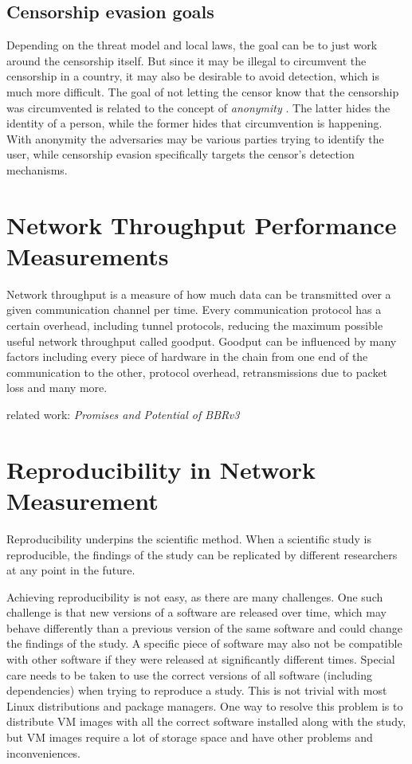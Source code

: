 \subsection{Censorship evasion goals}
Depending on the threat model and local laws, the goal can be to just work around the censorship itself.
But since it may be illegal to circumvent the censorship in a country, it may also be desirable to avoid detection, which is much more difficult. 
The goal of not letting the censor know that the censorship was circumvented is related to the concept of \textit{anonymity} \cite{wiki:Anonymity}.
The latter hides the identity of a person, while the former hides that circumvention is happening.
With anonymity the adversaries may be various parties trying to identify the user, while censorship evasion specifically targets the censor's detection mechanisms.

\section{Network Throughput Performance Measurements}
Network throughput is a measure of how much data can be transmitted over a given communication channel per time.
Every communication protocol has a certain overhead, including tunnel protocols, reducing the maximum possible useful network throughput called goodput.
Goodput can be influenced by many factors including every piece of hardware in the chain from one end of the communication to the other, protocol overhead, retransmissions due to packet loss and many more.

related work: \textit{Promises and Potential of BBRv3} \cite{Promises-and-Potential-of-BBRv3}

\section{Reproducibility in Network Measurement}
Reproducibility \cite{wiki:Reproducibility} underpins the scientific method.
When a scientific study is reproducible, the findings of the study can be replicated by different researchers at any point in the future.

Achieving reproducibility is not easy, as there are many challenges.
One such challenge is that new versions of a software are released over time, which may behave differently than a previous version of the same software and could change the findings of the study.
A specific piece of software may also not be compatible with other software if they were released at significantly different times.
Special care needs to be taken to use the correct versions of all software (including dependencies) when trying to reproduce a study.
This is not trivial with most Linux distributions and package managers.
One way to resolve this problem is to distribute VM images with all the correct software installed along with the study, but VM images require a lot of storage space and have other problems and inconveniences.

